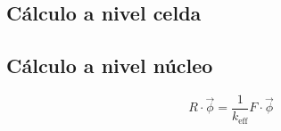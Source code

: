 % 
% 
% 
% 


\subsection{Cálculo a nivel celda} %
\label{sec:celda}


\subsection{Cálculo a nivel núcleo} %

{\color{red}
\lipsum[14]

\begin{equation}
 R \cdot \vec{\phi} = \frac{1}{k_\text{eff}} F \cdot \vec{\phi}
\end{equation}

\lipsum[15]
}



